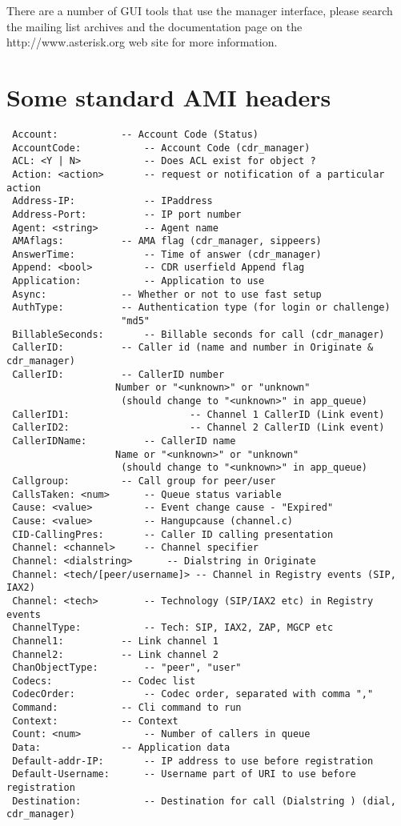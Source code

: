 There are a number of GUI tools that use the manager interface, please search
the mailing list archives and the documentation page on the 
http://www.asterisk.org web site for more information.


\section{Some standard AMI headers}
\begin{verbatim}
 Account: 			-- Account Code (Status)
 AccountCode:			-- Account Code (cdr_manager)
 ACL: <Y | N>			-- Does ACL exist for object ?
 Action: <action>		-- request or notification of a particular action
 Address-IP:			-- IPaddress 
 Address-Port:			-- IP port number
 Agent: <string>		-- Agent name
 AMAflags:			-- AMA flag (cdr_manager, sippeers)
 AnswerTime:			-- Time of answer (cdr_manager)
 Append: <bool>			-- CDR userfield Append flag
 Application:			-- Application to use
 Async:				-- Whether or not to use fast setup
 AuthType: 			-- Authentication type (for login or challenge)
					"md5"
 BillableSeconds:		-- Billable seconds for call (cdr_manager)
 CallerID:			-- Caller id (name and number in Originate & cdr_manager)
 CallerID:			-- CallerID number
				   Number or "<unknown>" or "unknown" 
					(should change to "<unknown>" in app_queue)
 CallerID1:                     -- Channel 1 CallerID (Link event)
 CallerID2:                     -- Channel 2 CallerID (Link event)
 CallerIDName:			-- CallerID name
				   Name or "<unknown>" or "unknown" 
					(should change to "<unknown>" in app_queue)
 Callgroup:			-- Call group for peer/user
 CallsTaken: <num>		-- Queue status variable
 Cause: <value>			-- Event change cause - "Expired"
 Cause: <value>			-- Hangupcause (channel.c)
 CID-CallingPres:		-- Caller ID calling presentation
 Channel: <channel>		-- Channel specifier
 Channel: <dialstring>		-- Dialstring in Originate
 Channel: <tech/[peer/username]> -- Channel in Registry events (SIP, IAX2)
 Channel: <tech>		-- Technology (SIP/IAX2 etc) in Registry events
 ChannelType:			-- Tech: SIP, IAX2, ZAP, MGCP etc
 Channel1:			-- Link channel 1
 Channel2:			-- Link channel 2
 ChanObjectType:		-- "peer", "user"
 Codecs:			-- Codec list
 CodecOrder:			-- Codec order, separated with comma ","
 Command:			-- Cli command to run
 Context:			-- Context
 Count: <num>			-- Number of callers in queue
 Data:				-- Application data
 Default-addr-IP:		-- IP address to use before registration
 Default-Username:		-- Username part of URI to use before registration
 Destination:			-- Destination for call (Dialstring ) (dial, cdr_manager)

\end{verbatim}
